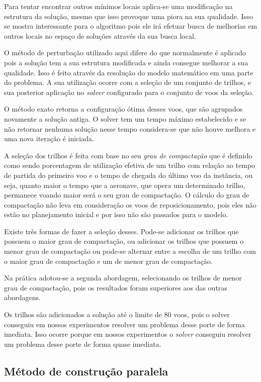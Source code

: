 Para tentar encontrar outros mínimos locais aplica-se uma modificação na
estrutura da solução, mesmo que isso provoque uma piora na sua qualidade. Isso
se mostra interessante para o algoritmo pois ele irá efetuar busca de melhorias
em outros locais no espaço de soluções através da sua busca local.
 
O método de perturbação utilizado aqui difere do que normalmente é aplicado
pois a solução tem a sua estrutura modificada e ainda consegue melhorar a sua
qualidade. Isso é feito através da resolução do modelo matemático em uma
parte do problema. A sua utilização ocorre com a seleção de um conjunto de
trilhos, e sua posterior aplicação no \textit{solver} configurado para o
conjunto de voos da seleção.

O método exato retorna a configuração ótima desses voos, que
são agrupados novamente a solução antiga. O solver tem um tempo máximo
estabelecido e se não retornar nenhuma solução nesse tempo considera-se que não
houve melhora e uma nova iteração é iniciada.

A seleção dos trilhos é feita com base no seu
\textit{grau de compactação} que é definido como sendo porcentagem de
utilização efetiva de um trilho com relação ao tempo de partida do primeiro voo
e o tempo de chegada do último voo da instância, ou seja, quanto maior o tempo
que a aeronave, que opera um determinado trilho, permanece voando maior será o
seu grau de compactação. O cálculo do grau de compactação não leva em
consideração os voos de reposicionamento, pois eles não estão no planejamento
inicial e por isso não são passados para o modelo.

Existe três formas de fazer a seleção desses. Pode-se adicionar os trilhos que
possuem o maior grau de compactação, ou adicionar os trilhos que possuem o
menor grau de compactação ou pode-se alternar entre a escolha de um trilho com
o maior grau de compactação e um de menor grau de compactação.

Na prática adotou-se a segunda abordagem, selecionando os trilhos de menor grau
de compactação, pois os resultados foram superiores aos das outras abordagens.
 
Os trilhos são adicionados a solução até o limite de 80 voos, pois o solver
conseguiu em nossos experimentos resolver um problema desse porte de forma
imediata. Isso ocorre porque em nossos experimentos o \textit{solver} conseguiu
resolver um problema desse porte de forma quase imediata.

\subsection{Método de construção paralela}

